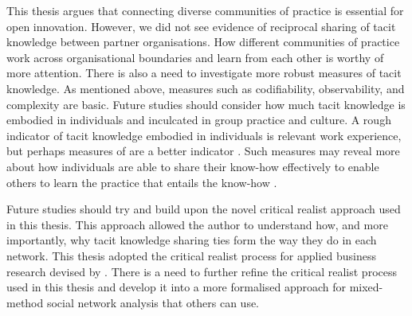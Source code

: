 This thesis argues that connecting diverse communities of practice is essential for open innovation. However, we did not see evidence of reciprocal sharing of tacit knowledge between partner organisations. How different communities of practice work across organisational boundaries and learn from each other is worthy of more attention. There is also a need to investigate more robust measures of tacit knowledge. As mentioned above, measures such as codifiability, observability, and complexity are basic. Future studies should consider how much tacit knowledge is embodied in individuals and inculcated in group practice and culture. A rough indicator of tacit knowledge embodied in individuals is relevant work experience, but perhaps measures of  are a better indicator \citep{hedlund2002tacit}. Such measures may reveal more about how individuals are able to share their know-how effectively to enable others to learn the practice that entails the know-how \citep{van1986central, cook1999bridging}. \medskip 

Future studies should try and build upon the novel critical realist approach used in this thesis. This approach allowed the author to understand how, and more importantly, why tacit knowledge sharing ties form the way they do in each network. This thesis adopted the critical realist process for applied business research devised by \citet{mcavoy2018critical}. There is a need to further refine the critical realist process used in this thesis and develop it into a more formalised approach for mixed-method social network analysis that others can use. 

